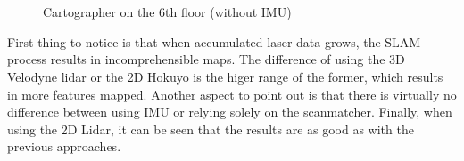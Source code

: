 \begin{figure}[h!]
  \centering
   \quad
   \\
   \quad 
   \\  
  \caption{Cartographer on the 6th floor (without IMU)}
  \label{fig:pevcarto6noimu}
\end{figure}

First thing to notice is that when accumulated laser data grows, the SLAM process results in incomprehensible maps. The difference of using the 3D Velodyne lidar or the 2D Hokuyo is the higer range of the former, which results in more features mapped. Another aspect to point out is that there is virtually no difference between using IMU or relying solely on the scanmatcher. Finally, when using the 2D Lidar, it can be seen that the results are as good as with the previous approaches.

